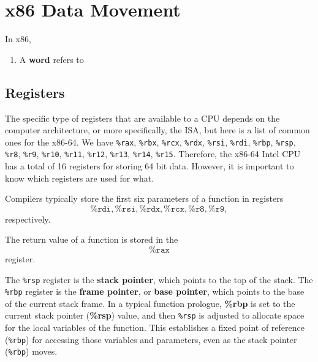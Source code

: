 \section{x86 Data Movement} 

  \begin{definition}
    In x86, 
    \begin{enumerate}
      \item A \textbf{word} refers to 
    \end{enumerate}
  \end{definition}

\subsection{Registers}

  The specific type of registers that are available to a CPU depends on the computer architecture, or more specifically, the ISA, but here is a list of common ones for the x86-64. We have \texttt{\%rax}, \texttt{\%rbx}, \texttt{\%rcx}, \texttt{\%rdx}, \texttt{\%rsi}, \texttt{\%rdi}, \texttt{\%rbp}, \texttt{\%rsp}, \texttt{\%r8}, \texttt{\%r9}, \texttt{\%r10}, \texttt{\%r11}, \texttt{\%r12}, \texttt{\%r13}, \texttt{\%r14}, \texttt{\%r15}. Therefore, the x86-64 Intel CPU has a total of 16 registers for storing 64 bit data. However, it is important to know which registers are used for what. 

  \begin{definition}
    Compilers typically store the first six parameters of a function in registers 
    \begin{equation}
      \texttt{\%rdi}, \texttt{\%rsi}, \texttt{\%rdx}, \texttt{\%rcx}, \texttt{\%r8}, \texttt{\%r9}, 
    \end{equation}
    respectively. 
  \end{definition}

  \begin{definition}
    The return value of a function is stored in the 
    \begin{equation}
      \texttt{\%rax} 
    \end{equation}
    register.
  \end{definition}

  \begin{definition}
    The \texttt{\%rsp} register is the \textbf{stack pointer}, which points to the top of the stack. The \texttt{\%rbp} register is the \textbf{frame pointer}, or \textbf{base pointer}, which points to the base of the current stack frame. In a typical function prologue, \textbf{\%rbp} is set to the current stack pointer (\textbf{\%rsp}) value, and then \texttt{\%rsp} is adjusted to allocate space for the local variables of the function. This establishes a fixed point of reference (\texttt{\%rbp}) for accessing those variables and parameters, even as the stack pointer (\texttt{\%rbp}) moves.
  \end{definition}

